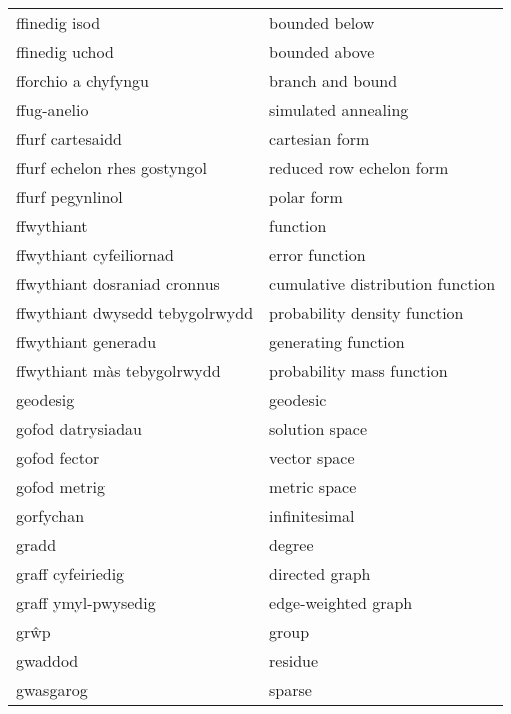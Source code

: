 \begin{supertabular}{p{0.22\textwidth}p{0.22\textwidth}}
                   ffinedig isod &                     bounded below \\
                  ffinedig uchod &                     bounded above \\
             fforchio a chyfyngu &                  branch and bound \\
                     ffug-anelio &               simulated annealing \\
                ffurf cartesaidd &                    cartesian form \\
    ffurf echelon rhes gostyngol &          reduced row echelon form \\
                ffurf pegynlinol &                        polar form \\
                      ffwythiant &                          function \\
         ffwythiant cyfeiliornad &                    error function \\
    ffwythiant dosraniad cronnus &  cumulative distribution function \\
 ffwythiant dwysedd tebygolrwydd &      probability density function \\
             ffwythiant generadu &               generating function \\
     ffwythiant màs tebygolrwydd &         probability mass function \\
                        geodesig &                          geodesic \\
               gofod datrysiadau &                    solution space \\
                    gofod fector &                      vector space \\
                    gofod metrig &                      metric space \\
                       gorfychan &                     infinitesimal \\
                           gradd &                            degree \\
               graff cyfeiriedig &                    directed graph \\
             graff ymyl-pwysedig &               edge-weighted graph \\
                            grŵp &                             group \\
                         gwaddod &                           residue \\
                       gwasgarog &                            sparse \\

\end{supertabular}
